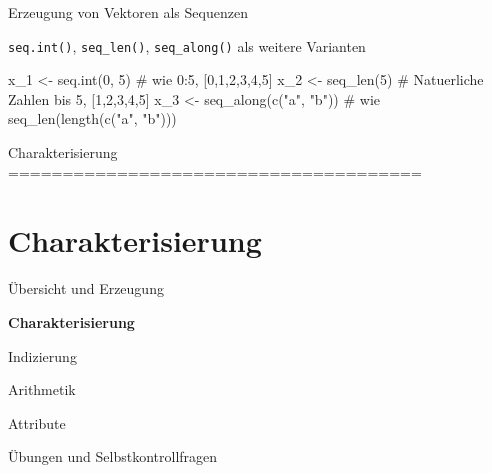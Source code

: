 \documentclass[
  8pt,
  ignorenonframetext,
]{beamer}
\newenvironment{Shaded}{\begin{snugshade}}{\end{snugshade}}
\newcommand{\CommentTok}[1]{\textcolor[rgb]{0.37,0.37,0.37}{#1}}
\newcommand{\DecValTok}[1]{\textcolor[rgb]{0.68,0.00,0.00}{#1}}
\newcommand{\FunctionTok}[1]{\textcolor[rgb]{0.28,0.35,0.67}{#1}}
\newcommand{\NormalTok}[1]{\textcolor[rgb]{0.00,0.23,0.31}{#1}}
\newcommand{\OtherTok}[1]{\textcolor[rgb]{0.00,0.23,0.31}{#1}}
\newcommand{\StringTok}[1]{\textcolor[rgb]{0.13,0.47,0.30}{#1}}
\begin{document}
\begin{frame}[fragile]{Erzeugung von Vektoren als Sequenzen}
\small

\texttt{seq.int()}, \texttt{seq\_len()}, \texttt{seq\_along()} als
weitere Varianten

\tiny

\begin{Shaded}
\begin{Highlighting}[]
\NormalTok{x\_1 }\OtherTok{\textless{}{-}} \FunctionTok{seq.int}\NormalTok{(}\DecValTok{0}\NormalTok{, }\DecValTok{5}\NormalTok{)             }\CommentTok{\# wie 0:5, [0,1,2,3,4,5]}
\NormalTok{x\_2 }\OtherTok{\textless{}{-}} \FunctionTok{seq\_len}\NormalTok{(}\DecValTok{5}\NormalTok{)                }\CommentTok{\# Natuerliche Zahlen bis 5, [1,2,3,4,5]}
\NormalTok{x\_3 }\OtherTok{\textless{}{-}} \FunctionTok{seq\_along}\NormalTok{(}\FunctionTok{c}\NormalTok{(}\StringTok{"a"}\NormalTok{, }\StringTok{"b"}\NormalTok{))    }\CommentTok{\# wie seq\_len(length(c("a", "b")))}
\end{Highlighting}
\end{Shaded}
\end{frame}

\begin{frame}[plain]{Charakterisierung
======================================}
\protect\hypertarget{charakterisierung}{}
\AtBeginSection{}
\section{Charakterisierung}

\large
{}
\vfill

Übersicht und Erzeugung

\textbf{Charakterisierung}

Indizierung

Arithmetik

Attribute

Übungen und Selbstkontrollfragen
\end{frame}
\end{document}
